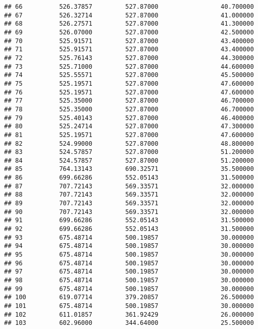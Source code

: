 \documentclass[]{article}
\begin{document}
\begin{verbatim}
## 66          526.37857         527.87000                 40.700000
## 67          526.32714         527.87000                 41.000000
## 68          526.27571         527.87000                 41.300000
## 69          526.07000         527.87000                 42.500000
## 70          525.91571         527.87000                 43.400000
## 71          525.91571         527.87000                 43.400000
## 72          525.76143         527.87000                 44.300000
## 73          525.71000         527.87000                 44.600000
## 74          525.55571         527.87000                 45.500000
## 75          525.19571         527.87000                 47.600000
## 76          525.19571         527.87000                 47.600000
## 77          525.35000         527.87000                 46.700000
## 78          525.35000         527.87000                 46.700000
## 79          525.40143         527.87000                 46.400000
## 80          525.24714         527.87000                 47.300000
## 81          525.19571         527.87000                 47.600000
## 82          524.99000         527.87000                 48.800000
## 83          524.57857         527.87000                 51.200000
## 84          524.57857         527.87000                 51.200000
## 85          764.13143         690.32571                 35.500000
## 86          699.66286         552.05143                 31.500000
## 87          707.72143         569.33571                 32.000000
## 88          707.72143         569.33571                 32.000000
## 89          707.72143         569.33571                 32.000000
## 90          707.72143         569.33571                 32.000000
## 91          699.66286         552.05143                 31.500000
## 92          699.66286         552.05143                 31.500000
## 93          675.48714         500.19857                 30.000000
## 94          675.48714         500.19857                 30.000000
## 95          675.48714         500.19857                 30.000000
## 96          675.48714         500.19857                 30.000000
## 97          675.48714         500.19857                 30.000000
## 98          675.48714         500.19857                 30.000000
## 99          675.48714         500.19857                 30.000000
## 100         619.07714         379.20857                 26.500000
## 101         675.48714         500.19857                 30.000000
## 102         611.01857         361.92429                 26.000000
## 103         602.96000         344.64000                 25.500000

\end{verbatim}
\end{document}
